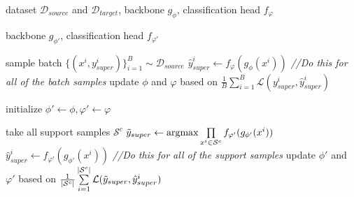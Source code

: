 \begin{latin}
	\begin{algorithm}
			\caption{Coarse-grained classifier (training)}\label{alg:coarse:train}
			\begin{algorithmic}[1]
					 \renewcommand{\algorithmicrequire}{\textbf{Input:}}
					\renewcommand{\algorithmicensure}{\textbf{Output:}}
					\renewcommand{\algorithmiccomment}[1]{\hfill \textit{//#1}}
					\REQUIRE dataset $\mathcal{D}_{source}$ and $\mathcal{D}_{target}$, backbone $g_\phi$, classification head $f_\varphi$
					
					\ENSURE backbone $g_{\phi'}$, classification head $f_{\varphi'}$
					
					\STATE sample batch $\{(x^i, y_{super}^i)\}_{i=1}^B\sim\mathcal{D}_{source}$ 
					\STATE $\hat{y}_{super}^i \leftarrow f_\varphi(g_\phi(x^i))$
					\hfill \textit{//Do this for all of the batch samples}
					\STATE update $\phi$ and $\varphi$ based on $\frac{1}{B}\sum\limits_{i=1}^B\mathcal{L}(y^i_{super}, \hat{y}^i_{super})$
					\ENDWHILE
					
					\STATE initialize $\phi' \leftarrow \phi, \varphi' \leftarrow \varphi$
					
					\STATE take all support samples $\mathcal{S}^c$
					\STATE $\Tilde{y}_{super} \leftarrow \operatorname*{argmax} \prod\limits_{x^i \in \mathcal{S}^c} f_{\varphi'}(g_{\phi'}(x^i))$
					\STATE $\hat{y}_{super}^i \leftarrow f_{\varphi'}\left(g_{\phi'}\left(x^i\right)\right)$
					\hfill\textit{//Do this for all of the support samples}
					\STATE update $\phi'$ and $\varphi'$ based on $\frac{1}{|\mathcal{S}^c|}\sum\limits_{i=1}^{|\mathcal{S}^c|}\mathcal{L}(\Tilde{y}_{super}, \hat{y}^i_{super})$
					\ENDFOR
				\end{algorithmic}
		\end{algorithm}
\end{latin}



